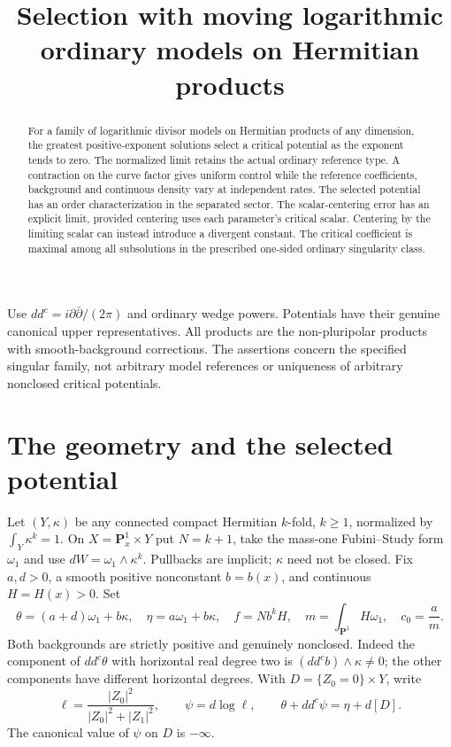 \documentclass[11pt]{article}
\title{Selection with moving logarithmic ordinary models\newline
on Hermitian products}
\author{}\date{}
\newcommand{\ddc}{dd^c}
\newcommand{\Pone}{\mathbf P^1}
\theoremstyle{remark}\newtheorem{remark}[theorem]{Remark}
\begin{document}
\maketitle
\begin{abstract}
For a family of logarithmic divisor models on Hermitian products of any dimension,
the greatest positive-exponent solutions select a critical potential as the
exponent tends to zero. The normalized limit retains the actual ordinary
reference type. A contraction on the curve factor gives uniform control
while the reference coefficients, background and continuous density vary
at independent rates. The selected potential has an order characterization
in the separated sector. The scalar-centering error has an explicit limit,
provided centering uses each parameter's critical scalar. Centering by the
limiting scalar can instead introduce a divergent constant.
The critical coefficient is maximal among all subsolutions in the prescribed
one-sided ordinary singularity class.
\end{abstract}

Use $\ddc=i\partial\bar\partial/(2\pi)$ and ordinary wedge powers.
Potentials have their genuine canonical upper representatives. All products
are the non-pluripolar products with smooth-background corrections.
The assertions concern the specified singular family, not arbitrary model
references or uniqueness of arbitrary nonclosed critical potentials.

\section{The geometry and the selected potential}

Let $(Y,\kappa)$ be any connected compact Hermitian $k$-fold, $k\geq1$,
normalized by $\int_Y\kappa^k=1$. On $X=\Pone_x\times Y$ put $N=k+1$,
take the mass-one Fubini--Study form $\omega_1$ and use
$dW=\omega_1\wedge\kappa^k$. Pullbacks are implicit; $\kappa$ need not be closed.
Fix $a,d>0$, a smooth positive nonconstant $b=b(x)$, and continuous $H=H(x)>0$.
Set
\[
 \theta=(a+d)\omega_1+b\kappa,\quad
 \eta=a\omega_1+b\kappa,\quad f=N b^kH,\quad
 m=\int_{\Pone}H\omega_1,\quad c_0=\frac am.
\]
Both backgrounds are strictly positive and genuinely nonclosed. Indeed the
component of $\ddc\theta$ with horizontal real degree two is
$(\ddc b)\wedge\kappa\ne0$; the other components have different horizontal degrees.
With $D=\{Z_0=0\}\times Y$, write
\[
 \ell=\frac{|Z_0|^2}{|Z_0|^2+|Z_1|^2},\qquad
 \psi=d\log\ell,\qquad
 \theta+\ddc\psi=\eta+d[D].
\]
The canonical value of $\psi$ on $D$ is $-\infty$.
\end{document}
